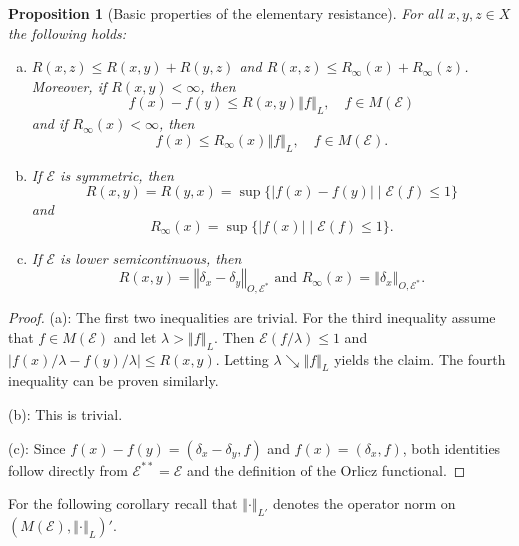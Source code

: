 \documentclass[a4paper,11pt,reqno]{amsart}
\newtheorem{proposition}[lemma]{Proposition}
\theoremstyle{definition}
\numberwithin{equation}{section}
\newcommand{\cE}{{\mathcal E}}
\newcommand{\av}[1]{\left\Vert #1\right\Vert}
\newcommand{\1}{\mathds{1}}
\begin{document}
\begin{proposition}[Basic properties of the elementary resistance] \label{proposition: some basic inequalities} For all $x,y,z \in X$ the following holds: 
 \begin{enumerate}[(a)]
 \item  $R(x,z) \leq R(x,y) + R(y,z)$ and $R(x,z) \leq R_\infty(x) + R_\infty(z)$. Moreover, if $R(x,y) < \infty$, then
 $$f(x) - f(y) \leq R(x,y) \av{f}_L, \quad f \in M(\cE)$$
 and if $R_\infty(x) < \infty$, then 
  $$f(x)  \leq R_\infty(x) \av{f}_L, \quad f \in M(\cE).$$

 
  \item If $\cE$ is symmetric, then 
  $$R(x,y) = R(y,x) = \sup \{|f(x) - f(y)| \mid \cE(f) \leq 1\}$$
  and 
  $$R_\infty(x) = \sup \{|f(x)| \mid \cE(f) \leq 1\}.$$
  
  
  \item If $\cE$ is lower semicontinuous, then 
  $$R(x,y) = \av{\delta_x - \delta_y}_{O,\cE^*} \text{ and } R_\infty(x) = \av{\delta_x}_{O,\cE^*}.$$
  
 \end{enumerate}
\end{proposition}
\begin{proof}
 (a): The first two inequalities are trivial. For the third inequality assume that $f \in M(\cE)$ and let $\lambda > \av{f}_L$. Then $\cE(f/\lambda) \leq 1$ and $|f(x)/\lambda - f(y)/\lambda| \leq R(x,y)$. Letting $\lambda \searrow \av{f}_L$ yields the claim. The fourth inequality can be proven similarly. 
 
 (b): This is trivial. 
 
 (c): Since $f(x) - f(y) = (\delta_x - \delta_y,f)$ and $f(x) = (\delta_x,f)$, both identities  follow directly from $\cE^{**} = \cE$ and the definition of the Orlicz functional.
\end{proof}






For the following corollary recall that $\av{\cdot}_{L'}$ denotes the operator norm on $(M(\cE),\av{\cdot}_L)'$.
\end{document}
